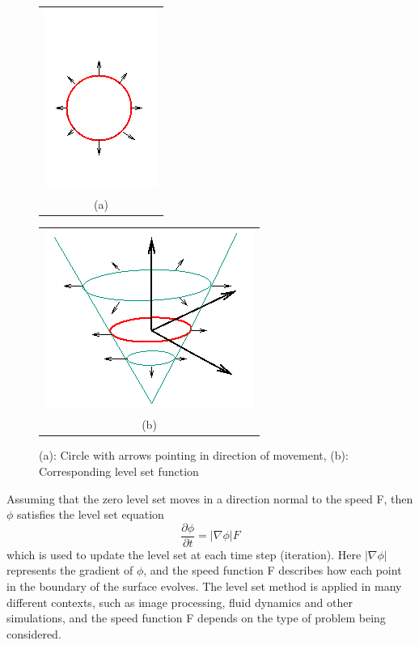 \begin{figure}[h!]
\centering
\begin{minipage}{.4\textwidth}
\begin{tabular}{c}
\includegraphics[height=.3\textheight]{backgroundTheory/levelset/f1a} \\
(a)
\end{tabular}
\end{minipage}
\begin{minipage}{.4\textwidth}
\begin{tabular}{c}
\includegraphics[height=.3\textheight]{backgroundTheory/levelset/f1b} \\
(b)
\end{tabular}
\end{minipage}
\caption{(a): Circle with arrows pointing in direction of movement, (b): Corresponding level set function}
\label{levelsetEx}
\end{figure}

Assuming that the zero level set moves in a direction normal to the speed F, then \(\phi\) satisfies the level set equation
\begin{equation}
\frac{\partial \phi}{\partial t} = |\nabla \phi|F
\label{levelSetEq}
\end{equation}
which is used to update the level set at each time step (iteration). Here \(|\nabla \phi|\) represents the gradient of \(\phi\), and the speed function F describes how each point in the boundary of the surface evolves. The level set method is applied in many different contexts, such as image processing, fluid dynamics and other simulations, and the speed function F depends on the type of problem being considered. 

